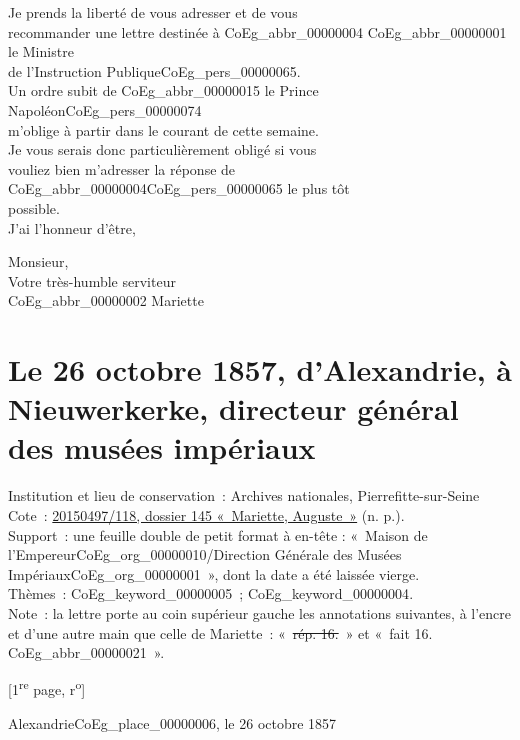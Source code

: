 \documentclass{book}
\begin{document}
{\indent Je prends la liberté de vous adresser et de vous\\
recommander une lettre destinée à \gls{CoEg_abbr_00000004} \gls{CoEg_abbr_00000001} le Ministre\\
de l’Instruction Publique\gls{CoEg_pers_00000065}.\\
\indent Un ordre subit de \gls{CoEg_abbr_00000015} le Prince Napoléon\gls{CoEg_pers_00000074}\\
m’oblige à partir dans le courant de cette semaine.\\
Je vous serais donc particulièrement obligé si vous\\
vouliez bien m’adresser la réponse de \gls{CoEg_abbr_00000004}\gls{CoEg_pers_00000065} le plus tôt\\
possible.\\
\indent J’ai l’honneur d’être,
\begin{center}Monsieur,\\
\hspace{5cm}Votre très-humble serviteur\\
\hspace{5cm}\gls{CoEg_abbr_00000002} Mariette\end{center}

\hypertarget{CoEg_Mariette_1857-10-26}{}
\section*{Le 26 octobre 1857, d’Alexandrie, à Nieuwerkerke, directeur général des musées impériaux}  
{\footnotesize \noindent Institution et lieu de conservation~: Archives nationales, Pierrefitte-sur-Seine\\
Cote~: \hyperlink{CoEg_Mariette_ms_001}{20150497/118, dossier 145 «~Mariette, Auguste~»} (n. p.).\\
Support~: une feuille double de petit format à en-tête : «~Maison de l'Empereur\gls{CoEg_org_00000010}/Direction Générale des Musées Impériaux\gls{CoEg_org_00000001}~», dont la date a été laissée vierge.\\
Thèmes~: \gls{CoEg_keyword_00000005}~; \gls{CoEg_keyword_00000004}.\\
Note~: la lettre porte au coin supérieur gauche les annotations suivantes, à l’encre et d’une autre main que celle de Mariette~: «~\sout{rép. 16.}~» et «~fait 16. \gls{CoEg_abbr_00000021}~».

\begin{center} {[1\textsuperscript{re} page, r\textsuperscript{o}]}\end{center}}
\begin{flushright}Alexandrie\gls{CoEg_place_00000006}, le 26 octobre 1857\end{flushright} 

}
\end{document}
